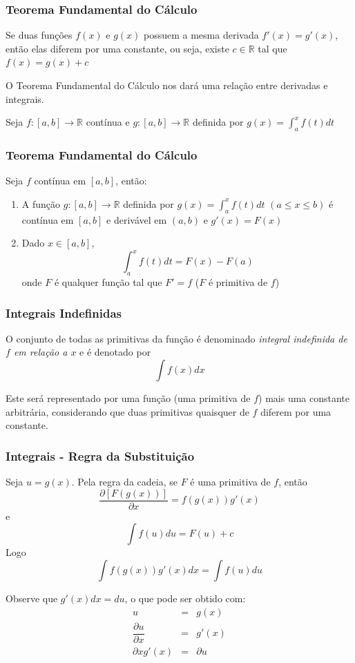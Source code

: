 \documentclass[hyperref={pdfpagelabels=false}]{beamer}
\begin{document}
\begin{frame}
\frametitle{Teorema Fundamental do Cálculo}
\begin{lemma}
	Se duas funções $f(x)$ e $g(x)$ possuem a mesma derivada $f'(x) = g'(x)$, então elas diferem por uma constante, ou seja, existe $c \in \mathbb{R}$ tal que $f(x) = g(x) + c$
\end{lemma}

\pause

O Teorema Fundamental do Cálculo nos dará uma relação entre derivadas e integrais.

Seja $f:[a,b] \rightarrow \mathbb{R}$ contínua e $g:[a,b] \rightarrow \mathbb{R}$ definida por $g(x) = \int_{a}^{x}f(t)dt$

\end{frame}

\begin{frame}
\frametitle{Teorema Fundamental do Cálculo}
\begin{theorem}
	Seja $f$ contínua em $[a,b]$, então:
	\begin{enumerate}
		\item A função $g:[a,b] \rightarrow \mathbb{R}$ definida por $g(x) = \int_{a}^{x}f(t)dt$ $(a \leq x \leq b)$ é contínua em $[a,b]$ e derivável em $(a,b)$ e $g'(x) = F(x)$
		\item Dado $x \in [a,b]$,
		$$\int_{a}^{x}f(t)dt = F(x) - F(a)$$ onde $F$ é qualquer função tal que $F' = f$ ($F$ é primitiva de $f$)
	\end{enumerate}
\end{theorem}


\end{frame}

\begin{frame}
\frametitle{Integrais Indefinidas}
O conjunto de todas as primitivas da função é denominado \emph{integral indefinida de $f$ em relação a $x$} e é denotado por 
$$\int f(x)dx$$
\pause

Este será representado por uma função (uma primitiva de $f$) mais uma constante arbitrária, considerando que duas primitivas quaisquer de $f$ diferem por uma constante.

\end{frame}

\begin{frame}
\frametitle{Integrais - Regra da Substituição}

Seja $u=g(x)$. Pela regra da cadeia, se $F$ é uma primitiva de $f$, então
$$\dfrac{\partial[F(g(x))]}{\partial x} = f(g(x))g'(x)$$
e
$$\int f(u)du = F(u) + c$$
Logo
$$\int f(g(x))g'(x)dx = \int f(u)du$$

Observe que $g'(x)dx = du$, o que pode ser obtido com:
\begin{eqnarray*}
u & = & g(x) \\
\dfrac{\partial u}{\partial x} & = & g'(x) \\
\partial x g'(x) & = & \partial u
\end{eqnarray*}

\end{frame}
\end{document}
